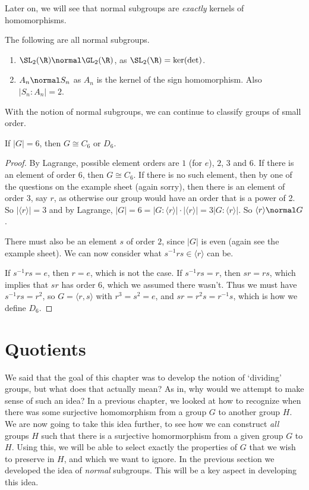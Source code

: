 \documentclass[a4]{scrreprt}
\newcommand{\newsection}{\section}
\begin{document}
Later on, we will see that normal subgroups are \emph{exactly} kernels of homomorphisms.

\begin{example}
	The following are all normal subgroups.
	\begin{enumerate}
		\item $\SL_2(\R) \normal \GL_2(\R)$, as $\SL_2(\R) = \ker(\det)$.
		\item $A_n \normal S_n$ as $A_n$ is the kernel of the sign homomorphism. Also $|S_n : A_n| = 2$.
	\end{enumerate}
\end{example}

With the notion of normal subgroups, we can continue to classify groups of small order.

\begin{proposition}
	If $|G| = 6$, then $G \cong C_6$ or $D_6$.
\end{proposition}
\begin{proof}
	By Lagrange, possible element orders are $1$ (for $e$), $2$, $3$ and $6$. If there is an element of order 6, then $G \cong C_6$. If there is no such element, then by one of the questions on the example sheet (again sorry), then there is an element of order $3$, say $r$, as otherwise our group would have an order that is a power of 2. So $|\langle r \rangle| = 3$ and by Lagrange, $|G| = 6 = |G: \langle r \rangle| \cdot |\langle r \rangle| = 3 |G: \langle r \rangle|$. So $\langle r \rangle \normal G$.

	There must also be an element $s$ of order $2$, since $|G|$ is even (again see the example sheet). We can now consider what $s^{-1} r s \in \langle r \rangle$ can be.

	If $s^{-1} r s = e$, then $r = e$, which is not the case. If $s^{-1} r s = r$, then $sr = rs$, which implies that $sr$ has order 6, which we assumed there wasn't. Thus we must have $s^{-1} r s = r^2$, so $G = \langle r, s \rangle$ with $r^3 = s^2 = e$, and $sr = r^2 s = r^{-1}s$, which is how we define $D_6$.
\end{proof}

\newsection{Quotients}

We said that the goal of this chapter was to develop the notion of `dividing' groups, but what does that actually mean? As in, why would we attempt to make sense of such an idea?
In a previous chapter, we looked at how to recognize when there was some surjective homomorphism from a group $G$ to another group $H$.
We are now going to take this idea further, to see how we can construct \emph{all} groups $H$ such that there is a surjective homormorphism from a given group $G$ to $H$.
Using this, we will be able to select exactly the properties of $G$ that we wish to preserve in $H$, and which we want to ignore.
In the previous section we developed the idea of \emph{normal} subgroups. This will be a key aspect in developing this idea.
\end{document}
